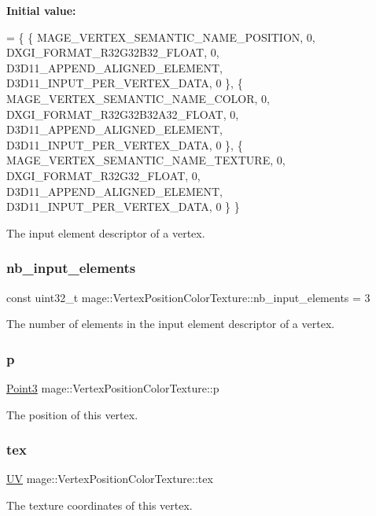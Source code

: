 {\bfseries Initial value\+:}
\begin{DoxyCode}
= \{
        \{ MAGE\_VERTEX\_SEMANTIC\_NAME\_POSITION, 0, DXGI\_FORMAT\_R32G32B32\_FLOAT,    0, 
      D3D11\_APPEND\_ALIGNED\_ELEMENT, D3D11\_INPUT\_PER\_VERTEX\_DATA, 0 \},
        \{ MAGE\_VERTEX\_SEMANTIC\_NAME\_COLOR,    0, DXGI\_FORMAT\_R32G32B32A32\_FLOAT, 0, 
      D3D11\_APPEND\_ALIGNED\_ELEMENT, D3D11\_INPUT\_PER\_VERTEX\_DATA, 0 \},
        \{ MAGE\_VERTEX\_SEMANTIC\_NAME\_TEXTURE,  0, DXGI\_FORMAT\_R32G32\_FLOAT,       0, 
      D3D11\_APPEND\_ALIGNED\_ELEMENT, D3D11\_INPUT\_PER\_VERTEX\_DATA, 0 \}
    \}
\end{DoxyCode}
The input element descriptor of a vertex. \hypertarget{structmage_1_1_vertex_position_color_texture_a435a9387a5dda4fb5aff9b9b3f11e736}{}\label{structmage_1_1_vertex_position_color_texture_a435a9387a5dda4fb5aff9b9b3f11e736} 
\subsubsection{\texorpdfstring{nb\+\_\+input\+\_\+elements}{nb\_input\_elements}}
{\footnotesize\ttfamily const uint32\+\_\+t mage\+::\+Vertex\+Position\+Color\+Texture\+::nb\+\_\+input\+\_\+elements = 3\hspace{0.3cm}{\ttfamily [static]}}

The number of elements in the input element descriptor of a vertex. \hypertarget{structmage_1_1_vertex_position_color_texture_a145c2e2fce90b07252b778b46e31ea24}{}\label{structmage_1_1_vertex_position_color_texture_a145c2e2fce90b07252b778b46e31ea24} 
\subsubsection{\texorpdfstring{p}{p}}
{\footnotesize\ttfamily \hyperlink{structmage_1_1_point3}{Point3} mage\+::\+Vertex\+Position\+Color\+Texture\+::p}

The position of this vertex. \hypertarget{structmage_1_1_vertex_position_color_texture_adfbaa105e46bb65f502ec33eaa2e8b15}{}\label{structmage_1_1_vertex_position_color_texture_adfbaa105e46bb65f502ec33eaa2e8b15} 
\subsubsection{\texorpdfstring{tex}{tex}}
{\footnotesize\ttfamily \hyperlink{structmage_1_1_u_v}{UV} mage\+::\+Vertex\+Position\+Color\+Texture\+::tex}

The texture coordinates of this vertex. 